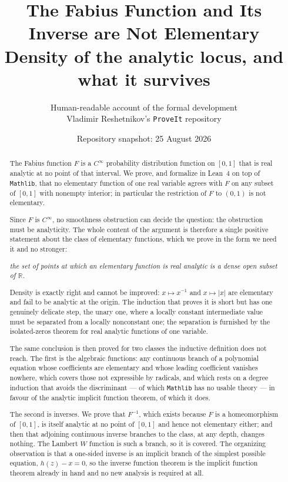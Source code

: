 \documentclass[11pt,oneside]{article}
\title{\bfseries The Fabius Function and Its Inverse are Not Elementary\\[0.35em]
\large Density of the analytic locus, and what it survives}
\author{Human-readable account of the formal development\\
\small Vladimir Reshetnikov's \texttt{ProveIt} repository}
\date{Repository snapshot: 25 August 2026}
\theoremstyle{definition}
\theoremstyle{remark}
\newcommand{\R}{\mathbb R}
\begin{document}
\maketitle

\begin{abstract}
The Fabius function $F$ is a $C^\infty$ probability distribution function on
$[0,1]$ that is real analytic at no point of that interval.  We prove, and
formalize in Lean~4 on top of \texttt{Mathlib}, that no elementary function of
one real variable agrees with $F$ on any subset of $[0,1]$ with nonempty
interior; in particular the restriction of $F$ to $(0,1)$ is not elementary.

Since $F$ is $C^\infty$, no smoothness obstruction can decide the question:
the obstruction must be analyticity.  The whole content of the argument is
therefore a single positive statement about the class of elementary functions,
which we prove in the form we need it and no stronger:

\begin{center}
\emph{the set of points at which an elementary function is real analytic is a
dense open subset of $\R$.}
\end{center}

Density is exactly right and cannot be improved: $x\mapsto x^{-1}$ and
$x\mapsto |x|$ are elementary and fail to be analytic at the origin.  The
induction that proves it is short but has one genuinely delicate step, the
unary one, where a locally constant intermediate value must be separated from
a locally nonconstant one; the separation is furnished by the isolated-zeros
theorem for real analytic functions of one variable.

The same conclusion is then proved for two classes the inductive definition
does not reach.  The first is the algebraic functions: any continuous branch
of a polynomial equation whose coefficients are elementary and whose leading
coefficient vanishes nowhere, which covers those not expressible by radicals,
and which rests on a degree induction that avoids the discriminant --- of
which \texttt{Mathlib} has no usable theory --- in favour of the analytic
implicit function theorem, of which it does.

The second is inverses.  We prove that $F^{-1}$, which exists because $F$ is a
homeomorphism of $[0,1]$, is itself analytic at no point of $[0,1]$ and hence
not elementary either; and then that adjoining continuous inverse branches to
the class, at any depth, changes nothing.  The Lambert $W$ function is such a
branch, so it is covered.  The organizing observation is that a one-sided
inverse is an implicit branch of the simplest possible equation, $h(z)-x=0$, so the
inverse function theorem is the implicit function theorem already in hand and
no new analysis is required at all.
\end{abstract}
\end{document}
